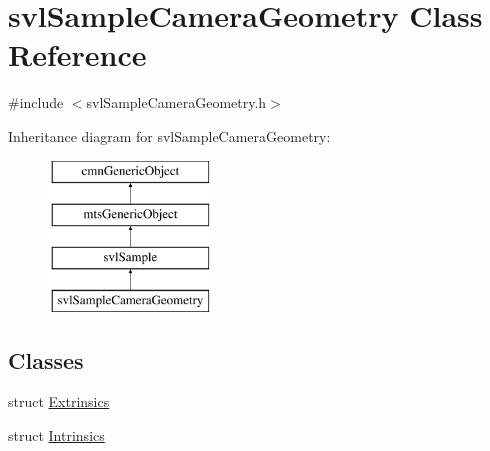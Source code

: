 \hypertarget{classsvl_sample_camera_geometry}{}\section{svl\+Sample\+Camera\+Geometry Class Reference}
\label{classsvl_sample_camera_geometry}


{\ttfamily \#include $<$svl\+Sample\+Camera\+Geometry.\+h$>$}

Inheritance diagram for svl\+Sample\+Camera\+Geometry\+:\begin{figure}[H]
\begin{center}
\leavevmode
\includegraphics[height=4.000000cm]{d6/d93/classsvl_sample_camera_geometry}
\end{center}
\end{figure}
\subsection*{Classes}
\begin{DoxyCompactItemize}
\item 
struct \hyperlink{structsvl_sample_camera_geometry_1_1_extrinsics}{Extrinsics}
\item 
struct \hyperlink{structsvl_sample_camera_geometry_1_1_intrinsics}{Intrinsics}
\end{DoxyCompactItemize}
